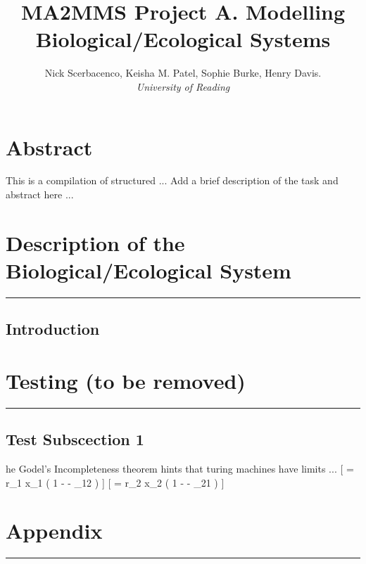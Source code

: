 \documentclass[11pt]{article}
\title{\textbf{MA2MMS Project A. Modelling Biological/Ecological Systems}}
\author{Nick Scerbacenco, Keisha M. Patel, Sophie Burke, Henry Davis. \\
        \textit{University of Reading}}
\date{ }
\begin{document}
\pagestyle{fancy}


\maketitle
\thispagestyle{empty} 

\section*{\textbf{Abstract}}
This is a compilation of structured ... Add a brief description of the task and abstract here ...

\tableofcontents

\newpage


\section{Description of the Biological/Ecological System}
\hrule height 0.8pt 
\vspace{5mm}

\subsection{Introduction}


\newpage
\section{Testing (to be removed)}
\hrule height 0.8pt 
\vspace{5mm}

\subsection{Test Subscection 1}

\lettrine[findent=2pt]{}{ } he Godel's Incompleteness theorem hints that turing machines have limits ...
[  = r_1 x_1 \left( 1 -  - \alpha_{12}  \right) ]
[  = r_2 x_2 \left( 1 -  - \alpha_{21}  \right) ]

\newpage 
\section*{Appendix}
\hrule height 0.8pt 
\vspace{5mm}


\end{document}
